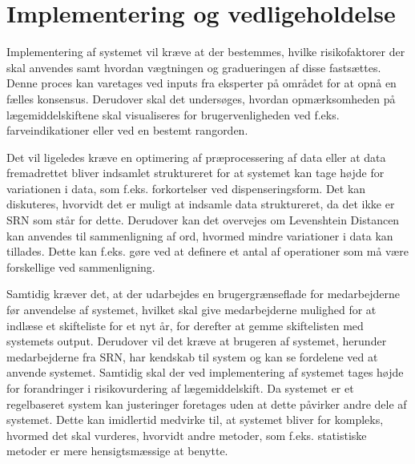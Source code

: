 \section{Implementering og vedligeholdelse}
Implementering af systemet vil kræve at der bestemmes, hvilke risikofaktorer der skal anvendes samt hvordan vægtningen og gradueringen af disse fastsættes. Denne proces kan varetages ved inputs fra eksperter på området for at opnå en fælles konsensus. Derudover skal det undersøges, hvordan opmærksomheden på lægemiddelskiftene skal visualiseres for brugervenligheden ved f.eks. farveindikationer eller ved en bestemt rangorden. 

Det vil ligeledes kræve en optimering af præprocessering af data eller at data fremadrettet bliver indsamlet struktureret for at systemet kan tage højde for variationen i data, som f.eks. forkortelser ved dispenseringsform. Det kan diskuteres, hvorvidt det er muligt at indsamle data struktureret, da det ikke er SRN som står for dette. Derudover kan det overvejes om Levenshtein Distancen kan anvendes til sammenligning af ord, hvormed mindre variationer i data kan tillades. Dette kan f.eks. gøre ved at definere et antal af operationer som må være forskellige ved sammenligning.

Samtidig kræver det, at der udarbejdes en brugergrænseflade for medarbejderne før anvendelse af systemet, hvilket skal give medarbejderne mulighed for at indlæse et skifteliste for et nyt år, for derefter at gemme skiftelisten med systemets output. Derudover vil det kræve at brugeren af systemet, herunder medarbejderne fra SRN, har kendskab til system og kan se fordelene ved at anvende systemet. Samtidig skal der ved implementering af systemet tages højde for forandringer i risikovurdering af lægemiddelskift. Da systemet er et regelbaseret system kan justeringer foretages uden at dette påvirker andre dele af systemet. Dette kan imidlertid medvirke til, at systemet bliver for kompleks, hvormed det skal vurderes, hvorvidt andre metoder, som f.eks. statistiske metoder er mere hensigtsmæssige at benytte.



